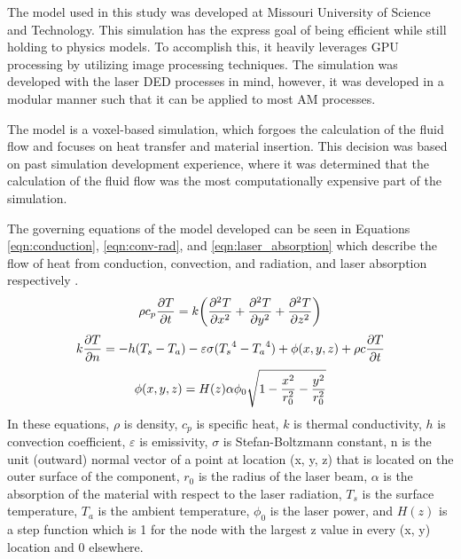 \label{model_description}

The model used in this study was developed at Missouri University of Science and Technology.
This simulation has the express goal of being efficient while still holding to physics models.  To accomplish this, it heavily leverages GPU processing by utilizing image processing techniques.  The simulation was developed with the laser \ac{DED} processes in mind, however, it was developed in a modular manner such that it can be applied to most \ac{AM} processes. 

The model is a voxel-based simulation, which forgoes the calculation of the fluid flow and focuses on heat transfer and material insertion.  This decision was based on past simulation development experience, where it was determined that the calculation of the fluid flow was the most computationally expensive part of the simulation.   

The governing equations of the model developed can be seen in Equations \ref{eqn:conduction}, \ref{eqn:conv-rad}, and \ref{eqn:laser_absorption} which describe the flow of heat from conduction, convection, and radiation, and laser absorption respectively \cite{Han2012}.
	\begin{equation}
	\label{eqn:conduction}
	\centering
	\rho c_p \frac{\partial T}{\partial t}=k \left(\frac{\partial^2 T}{\partial x^2} +\frac{\partial^2 T}{\partial y^2}+\frac{\partial^2 T}{\partial z^2} \right)
	\end{equation}
		\begin{equation}
		\label{eqn:conv-rad}
		\centering
		k \frac{\partial T}{\partial n}=-h (T_s-T_a) - \varepsilon \sigma ({T_s}^4-{T_a}^4) + \phi(x, y, z) + \rho c \frac{\partial T}{\partial t}
		\end{equation}
			\begin{equation}
			\label{eqn:laser_absorption}
			\centering
			\phi(x,y,z) = H(z) \alpha \phi_0 \sqrt{1-\frac{x^2}{r_0^2} -\frac{y^2}{r_0^2}}
			\end{equation}
In these equations, $\rho$ is density, $c_p$ is specific heat, $k$ is thermal conductivity, $h$ is convection coefficient, $\varepsilon$ is emissivity, $\sigma$ is Stefan-Boltzmann constant, n is the unit (outward) normal vector of a point at location (x, y, z) that is located on the outer surface of the component, $r_0$ is the radius of the laser beam, $\alpha$ is the absorption of the material with respect to the laser radiation, $T_s$ is the surface temperature,
$T_a$ is the ambient temperature, $\phi_0$ is the laser power, and $H(z)$ is a step function which is 1 for the node with the largest z value in every (x, y) location and 0 elsewhere.



